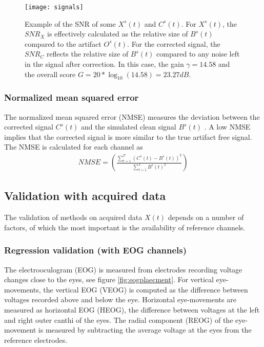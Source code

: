 \documentclass[twoside]{article}
\begin{document}
\begin{figure}
\centering

  \texttt{[image: signals]}
  \caption{Example of the SNR of some $X^s(t)$ and $C^s(t)$. For $X^s(t)$, the $SNR_X$ is effectively calculated as the relative size of $B^s(t)$ compared to the artifact $O^s(t)$. For the corrected signal, the $SNR_C$ reflects the relative size of $B^s(t)$ compared to any noise left in the signal after correction. In this case, the gain $\gamma = 14.58$ and the overall score $G = 20 *\log_{10}(14.58) = 23.27 dB$.  }
  

\label{fig:snr}
\end{figure}




\subsubsection{Normalized mean squared error}
The normalized mean squared error (NMSE) measures the deviation between the corrected signal $C^s(t)$ and the simulated clean signal $B^s(t)$ \cite{nmse}. A low NMSE implies that the corrected signal is more similar to the true artifact free signal. The NMSE is calculated for each channel as \begin{align}NMSE =  \left ( \frac{\sum^T_{t=1} (C^s(t) - B^s(t))^2}{\sum^T_{t=1} B^s(t)^2}\right ) \end{align}

\subsection{Validation with acquired data}
The validation of methods on acquired data $X(t)$ depends on a number of factors, of which the most important is the availability of reference channels. 

\subsubsection{Regression validation (with EOG channels)}
The electrooculogram (EOG) is measured from electrodes recording voltage changes close to the eyes, see figure \ref{fig:eogplaecment}. For vertical eye-movements, the vertical EOG (VEOG) is computed as the difference between voltages recorded above and below the eye. Horizontal eye-movements are measured as horizontal EOG (HEOG), the difference between voltages at the left and right outer canthi of the eyes. The radial component (REOG) of the eye-movement is measured by subtracting the average voltage at the eyes from the reference electrodes. 
\end{document}
